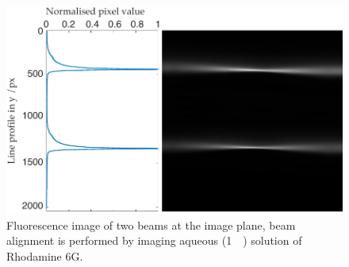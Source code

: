 \begin{figure}
  \centering
  \includegraphics{dual_beam_profile}
  \caption[Fluorescence image of two beams at the image plane]{Fluorescence image of two beams at the image plane, beam alignment is performed by imaging aqueous (\SI{1}{\milli{}}) solution of Rhodamine 6G.}
  \label{fig:real_dual_beams}
\end{figure}
%

